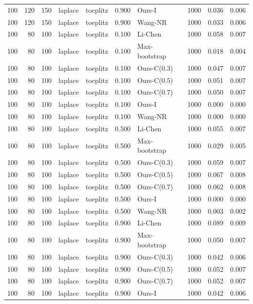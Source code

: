 \begin{tabular}{rrrllrlrrr}
100 & 120 & 150 & laplace & toeplitz & 0.900 & Ours-I & 1000 & 0.036 & 0.006 \\
100 & 120 & 150 & laplace & toeplitz & 0.900 & Wang-NR & 1000 & 0.033 & 0.006 \\
100 & 80 & 100 & laplace & toeplitz & 0.100 & Li-Chen & 1000 & 0.058 & 0.007 \\
100 & 80 & 100 & laplace & toeplitz & 0.100 & Max-bootstrap & 1000 & 0.018 & 0.004 \\
100 & 80 & 100 & laplace & toeplitz & 0.100 & Ours-C(0.3) & 1000 & 0.047 & 0.007 \\
100 & 80 & 100 & laplace & toeplitz & 0.100 & Ours-C(0.5) & 1000 & 0.051 & 0.007 \\
100 & 80 & 100 & laplace & toeplitz & 0.100 & Ours-C(0.7) & 1000 & 0.050 & 0.007 \\
100 & 80 & 100 & laplace & toeplitz & 0.100 & Ours-I & 1000 & 0.000 & 0.000 \\
100 & 80 & 100 & laplace & toeplitz & 0.100 & Wang-NR & 1000 & 0.000 & 0.000 \\
100 & 80 & 100 & laplace & toeplitz & 0.500 & Li-Chen & 1000 & 0.055 & 0.007 \\
100 & 80 & 100 & laplace & toeplitz & 0.500 & Max-bootstrap & 1000 & 0.029 & 0.005 \\
100 & 80 & 100 & laplace & toeplitz & 0.500 & Ours-C(0.3) & 1000 & 0.059 & 0.007 \\
100 & 80 & 100 & laplace & toeplitz & 0.500 & Ours-C(0.5) & 1000 & 0.067 & 0.008 \\
100 & 80 & 100 & laplace & toeplitz & 0.500 & Ours-C(0.7) & 1000 & 0.062 & 0.008 \\
100 & 80 & 100 & laplace & toeplitz & 0.500 & Ours-I & 1000 & 0.000 & 0.000 \\
100 & 80 & 100 & laplace & toeplitz & 0.500 & Wang-NR & 1000 & 0.003 & 0.002 \\
100 & 80 & 100 & laplace & toeplitz & 0.900 & Li-Chen & 1000 & 0.089 & 0.009 \\
100 & 80 & 100 & laplace & toeplitz & 0.900 & Max-bootstrap & 1000 & 0.050 & 0.007 \\
100 & 80 & 100 & laplace & toeplitz & 0.900 & Ours-C(0.3) & 1000 & 0.042 & 0.006 \\
100 & 80 & 100 & laplace & toeplitz & 0.900 & Ours-C(0.5) & 1000 & 0.052 & 0.007 \\
100 & 80 & 100 & laplace & toeplitz & 0.900 & Ours-C(0.7) & 1000 & 0.052 & 0.007 \\
100 & 80 & 100 & laplace & toeplitz & 0.900 & Ours-I & 1000 & 0.042 & 0.006 \\

\end{tabular}
